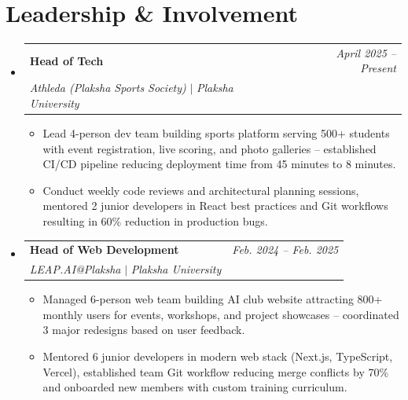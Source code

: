 \documentclass[letterpaper,11pt]{article}
\makeatletter
\newcommand{\resumeSubHeadingListStart}{\begin{itemize}[leftmargin=0.15in, label={}]}
\newcommand{\resumeSubHeadingListEnd}{\end{itemize}}
\newcommand{\resumeItemListStart}{\begin{itemize}[leftmargin=0.2in]}
\newcommand{\resumeItemListEnd}{\end{itemize}\vspace{1pt}}
\newcommand{\resumeItem}[1]{
  \item\small{#1 \vspace{-2pt}}
}
\newcommand{\resumeExperienceHeading}[4]{
  \vspace{-2pt}\item
    \begin{tabular*}{0.97\textwidth}[t]{l@{\extracolsep{\fill}}r}
      \textbf{\large #1} & \textit{\small #4} \\
      \textit{\small #2} $|$ \textit{\small #3} & \\[3pt] 
    \end{tabular*}
}
\makeatother
\begin{document}
\section{Leadership \& Involvement}
\resumeSubHeadingListStart
    \resumeExperienceHeading
      {Head of Tech}{Athleda (Plaksha Sports Society)}{Plaksha University}{April 2025 -- Present}
      \resumeItemListStart
          \resumeItem{Lead 4-person dev team building sports platform serving 500+ students with event registration, live scoring, and photo galleries -- established CI/CD pipeline reducing deployment time from 45 minutes to 8 minutes.}
          \resumeItem{Conduct weekly code reviews and architectural planning sessions, mentored 2 junior developers in React best practices and Git workflows resulting in 60\% reduction in production bugs.}
      \resumeItemListEnd
      
    \resumeExperienceHeading
      {Head of Web Development}{LEAP.AI@Plaksha}{Plaksha University}{Feb. 2024 -- Feb. 2025}
      \resumeItemListStart
        \resumeItem{Managed 6-person web team building AI club website attracting 800+ monthly users for events, workshops, and project showcases -- coordinated 3 major redesigns based on user feedback.}
        \resumeItem{Mentored 6 junior developers in modern web stack (Next.js, TypeScript, Vercel), established team Git workflow reducing merge conflicts by 70\% and onboarded new members with custom training curriculum.}
      \resumeItemListEnd
\resumeSubHeadingListEnd
\end{document}
